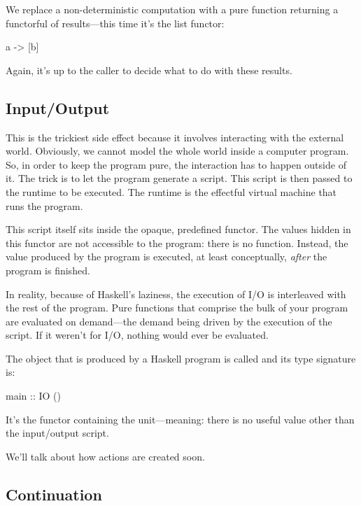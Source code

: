 \documentclass[DaoFP]{subfiles}
\begin{document}
We replace a non-deterministic computation  with a pure function returning a functorful of results---this time it's the list functor:
\begin{haskell}
a -> [b]
\end{haskell}
Again, it's up to the caller to decide what to do with these results.

\subsection{Input/Output}

This is the trickiest side effect because it involves interacting with the external world. Obviously, we cannot model the whole world inside a computer program. So, in order to keep the program pure, the interaction has to happen outside of it. The trick is to let the program generate a script. This script is then passed to the runtime to be executed. The runtime is the effectful virtual machine that runs the program. 

This script itself sits inside the opaque, predefined  functor. The values hidden in this functor are not accessible to the program: there is no  function. Instead, the  value produced by the program is executed, at least conceptually, \emph{after} the program is finished. 

In reality, because of Haskell's laziness, the execution of I/O is interleaved with the rest of the program.  Pure functions that comprise the bulk of your program are evaluated on demand---the demand being driven by the execution of the  script. If it weren't for I/O, nothing would ever be evaluated.

The  object that is produced by a Haskell program is called  and its type signature is:
\begin{haskell}
main :: IO ()
\end{haskell}
It's the  functor containing the unit---meaning: there is no useful value other than the input/output script.

We'll talk about how  actions are created soon.

\subsection{Continuation}
\end{document}
